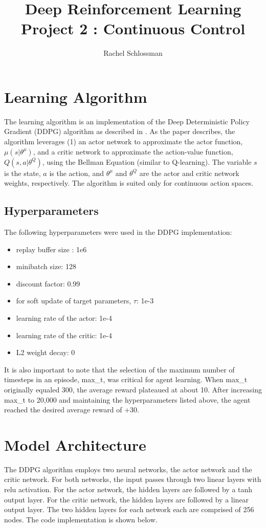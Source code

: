 \documentclass{article}
\begin{document}
\title{Deep Reinforcement Learning Project 2 : Continuous Control}
\author{Rachel Schlossman}

\maketitle

\section{Learning Algorithm}
The learning algorithm is an implementation of the Deep Deterministic Policy Gradient (DDPG) algorithm as described in \cite{lillicrap2015continuous}. As the paper describes, the algorithm leverages (1) an actor network to approximate the actor function, $\mu(s|\theta^{\mu})$, and a critic network to approximate the action-value function, $Q(s,a|\theta^Q)$, using the Bellman Equation (similar to Q-learning). The variable $s$ is the state, $a$ is the action, and $\theta^{\mu}$ and $\theta^{Q}$ are the actor and critic network weights, respectively.  The algorithm is suited only for continuous action spaces.

\subsection{Hyperparameters}
The following hyperparameters were used in the DDPG implementation:

\begin{itemize}
\item replay buffer size : 1e6
\item minibatch size: 128
\item discount factor: 0.99 
\item for soft update of target parameters, $\tau$: 1e-3
\item learning rate of the actor: 1e-4  
\item learning rate of the critic: 1e-4 
\item L2 weight decay: 0
\end{itemize}

It is also important to note that the selection of the maximum number of timesteps in an episode, max\_t, was critical for agent learning. When max\_t originally equaled 300, the average reward plateaued at about 10. After increasing max\_t to 20,000 and maintaining the hyperparameters listed above, the agent reached the desired average reward of +30.

\section{Model Architecture}
The DDPG algorithm employs two neural networks, the actor network and the critic network. For both networks, the input passes through two linear layers with relu activation. For the actor network, the hidden layers are followed by a tanh output layer. For the critic network, the hidden layers are followed by a linear output layer. The two hidden layers for each network each are comprised of 256 nodes. The code implementation is shown below. 
\end{document}

